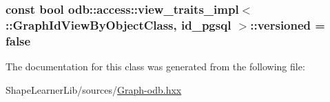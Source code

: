 \subsubsection[{versioned}]{\setlength{\rightskip}{0pt plus 5cm}const bool odb\+::access\+::view\+\_\+traits\+\_\+impl$<$ \+::{\bf Graph\+Id\+View\+By\+Object\+Class}, id\+\_\+pgsql $>$\+::versioned = false\hspace{0.3cm}{\ttfamily [static]}}\label{classodb_1_1access_1_1view__traits__impl_3_01_1_1_graph_id_view_by_object_class_00_01id__pgsql_01_4_a9bb9a2ac3e9b26427cdd47baa3f3dc46}


The documentation for this class was generated from the following file\+:\begin{DoxyCompactItemize}
\item 
Shape\+Learner\+Lib/sources/\hyperlink{_graph-odb_8hxx}{Graph-\/odb.\+hxx}\end{DoxyCompactItemize}

